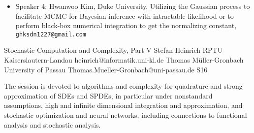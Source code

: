 \begin{session}
\begin{itemize}
 \item Speaker 4: Hwanwoo Kim, Duke University, Utilizing the Gaussian process to facilitate MCMC for Bayesian inference with intractable likelihood or to perform black-box numerical integration to get the normalizing constant, \texttt{ghksdn1227@gmail.com}
 \end{itemize}
 \begin{comment}
 If you would like to include references, please do so by creating a simple list numbered by [1], [2], [3], \ldots. See example below.
 Please do not use the \texttt{bibliography} environment or \texttt{bibtex} files.
 \begin{enumerate}
 \item[{[1]}] Niederreiter, Harald (1992). {\it Random number generation and quasi-Monte Carlo methods}. Society for Industrial and Applied Mathematics (SIAM).
 \item[{[2]}] Roberts, Gareth O, \& Rosenthal, Jeffrey S. (2002).  Optimal scaling for various Metropolis-Hastings algorithms, \textbf{16}(4), 351--367.
 \end{enumerate}
 Equations may be used if they are referenced. Please note that the equation numbers may be different (but will be cross-referenced correctly) in the final program book.
 \end{comment}
\end{session}



\clearpage

\begin{session}
 {Stochastic Computation and Complexity, Part V}%
 {Stefan Heinrich}%
 {RPTU Kaiserslautern-Landau}%
 {heinrich@informatik.uni-kl.de}%
 {Thomas M\"uller-Gronbach}%
 {University of Passau}%
 {Thomas.Mueller-Gronbach@uni-passau.de}%
 {S16}%
 {}%

 The session is devoted to algorithms and complexity for
 quadrature and strong approximation of SDEs and SPDEs, in particular under nonstandard assumptions,
 high and infinite dimensional integration and approximation, and
 stochastic optimization and neural networks,
 including connections to functional analysis and stochastic analysis.
 \medskip
\end{session}

